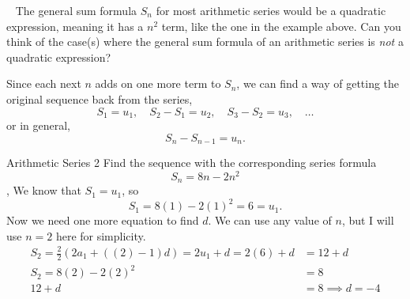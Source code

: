 \documentclass[../../main.tex]{subfiles}
\begin{document}
\begin{thinking}{~}
The general sum formula \(S_n\) for most arithmetic series would be a quadratic expression, meaning it has a \(n^2\) term, like the one in the example above. Can you think of the case(s) where the general sum formula of an arithmetic series is \emph{not} a quadratic expression?
\end{thinking}

Since each next \(n\) adds on one more term to \(S_n\), we can find a way of getting the original sequence back from the series,
\[
    S_1 = u_1,\quad S_2 - S_1 = u_2,\quad S_3 - S_2 = u_3,\quad \ldots
\]
or in general,
\[
    S_n - S_{n - 1} = u_n.
\]

\begin{example}{Arithmetic Series 2}
Find the sequence with the corresponding series formula
\[
    S_n = 8n - 2n^2
\]
\sep
We know that \(S_1 = u_1\), so
\[
    S_1 = 8(1) - 2(1)^2 = 6 = u_1.
\]
Now we need one more equation to find \(d\). We can use any value of \(n\), but I will use \(n = 2\) here for simplicity.
\begin{align}
    S_2 = \frac{2}2(2a_1 + ((2)-1)d) = 2u_1 + d = 2(6) + d &= 12 + d\\
    S_2 = 8(2) - 2(2)^2 &= 8\\
    12 + d &= 8 \implies d = -4
\end{align}
\end{example}
\end{document}
